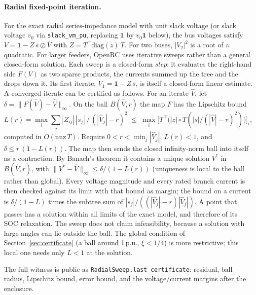 \documentclass[11pt,a4paper]{report}
\newcommand{\code}[1]{\texttt{\small #1}}
\begin{document}
\paragraph{Radial fixed-point iteration.} For the exact radial series-impedance
model with unit slack voltage (or slack voltage $v_0$ via
\code{slack\_vm\_pu}, replacing $\mathbf 1$ by $v_0\mathbf 1$ below), the bus
voltages satisfy $V = \mathbf 1 - Z\,\overline{s} \oslash \overline{V}$ with
$Z = T^{\top}\mathrm{diag}(z)\,T$. For two buses, $|V_2|^2$ is a root of a
quadratic. For larger feeders, OpenRC uses iterative sweeps rather than a
general closed-form solution. Each sweep is a closed-form \emph{step}: it
evaluates the right-hand side $F(V)$ as two sparse products, the currents
summed up the tree and the drops down it. Its first iterate, $V_1 = \mathbf 1 - Z\,\overline{s}$, is itself a
closed-form linear estimate. A converged iterate can be certified as follows.
For an iterate $\hat V$, let
$\delta = \|F(\hat V) - \hat V\|_\infty$. On the ball $B(\hat V, r)$ the map $F$ has
the Lipschitz bound
\[
  L(r) = \max_i \sum_j |Z_{ij}|\,|s_j| \,/\, (|\hat V_j| - r)^2
  \;\le\; \max_i \bigl[T^{\top}\bigl(|z| \circ T(|s| / (|\hat V| - r)^2)\bigr)\bigr]_i ,
\]
computed in $O(\mathrm{nnz}\,T)$. Require $0 < r < \min_j |\hat V_j|$,
$L(r) < 1$, and $\delta \le r\,(1 - L(r))$. The map then sends the closed
infinity-norm ball into itself as a contraction. By Banach's theorem it contains
a unique solution $V^\ast$ in $B(\hat V, r)$, with
$\|V^\ast - \hat V\|_\infty \le \delta/(1 - L(r))$ (uniqueness is local to the
ball rather than global). Every
voltage magnitude and every rated branch current is then checked against its
limit with that bound as margin; the bound on a current is
$\delta/(1-L)$ times the subtree sum of $|s_j|/((|\hat V_j| - r)|\hat V_j|)$. A
point that passes has a solution within all limits of the exact model, and
therefore of its SOC relaxation. The sweep does not claim infeasibility,
because a solution with large angles can lie outside the ball. The global
condition of Section~\ref{sec:certificate} (a ball around 1\,p.u., $\xi < 1/4$)
is more restrictive; this local one needs only $L < 1$
at the solution.

The full witness is public as
\code{RadialSweep.last\_certificate}: residual, ball radius, Lipschitz bound,
error bound, and the voltage/current margins after the enclosure.
\end{document}
